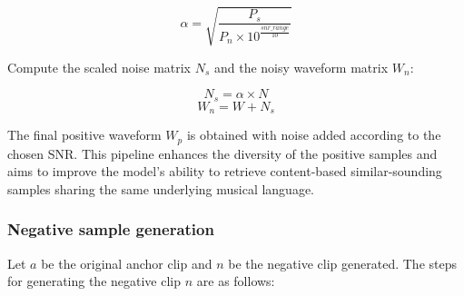 \begin{equation}
\alpha = \sqrt{\frac{P_s}{P_n \times 10^{\frac{snr\_range}{10}}}}
\end{equation}

Compute the scaled noise matrix $N_s$ and the noisy waveform matrix $W_n$:

\begin{equation}
N_s = \alpha \times N
\end{equation}
\begin{equation}
W_n = W + N_s
\end{equation}

The final positive waveform $W_p$ is obtained with noise added according to the chosen SNR. This pipeline enhances the diversity of the positive samples and aims to improve the model's ability to retrieve content-based similar-sounding samples sharing the same underlying musical language.

\subsubsection{Negative sample generation}

Let $a$ be the original anchor clip and $n$ be the negative clip generated. The steps for generating the negative clip $n$ are as follows:

